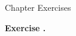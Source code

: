 \documentclass[12pt]{article}	%
\begin{document}
\begin{center}
\Large Chapter  Exercises
\end{center}

\begin{flushleft}
\textbf{Exercise .}
\end{flushleft}



\end{document}
